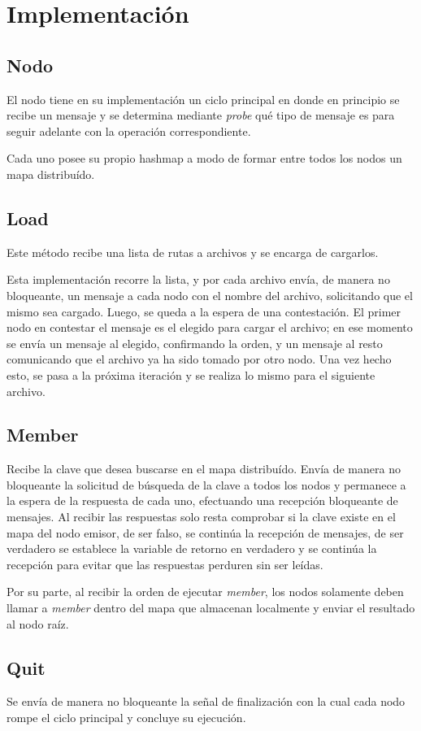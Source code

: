 \section{Implementación}

\subsection{Nodo}

El nodo tiene en su implementación un ciclo principal en donde en principio
se recibe un mensaje y se determina mediante \textit{probe} qué tipo de
mensaje es para seguir adelante con la operación correspondiente.

Cada uno posee su propio hashmap a modo de formar entre todos los nodos
un mapa distribuído.

\subsection{Load}

Este método recibe una lista de rutas a archivos y se encarga de cargarlos.

Esta implementación recorre la lista, y por cada archivo envía, de manera
no bloqueante, un mensaje a cada nodo con el nombre del archivo, solicitando
que el mismo sea cargado. Luego, se queda a la espera de una contestación. El
primer nodo en contestar el mensaje es el elegido para cargar el archivo; en
ese momento se envía un mensaje al elegido, confirmando la orden, y un mensaje
al resto comunicando que el archivo ya ha sido tomado por otro nodo. Una vez
hecho esto, se pasa a la próxima iteración y se realiza lo mismo para el
siguiente archivo.

\subsection{Member}

Recibe la clave que desea buscarse en el mapa distribuído. Envía de manera no
bloqueante la solicitud de búsqueda de la clave a todos los nodos y permanece
a la espera de la respuesta de cada uno, efectuando una recepción bloqueante
de mensajes. Al recibir las respuestas solo resta comprobar si la clave existe
en el mapa del nodo emisor, de ser falso, se continúa la recepción de
mensajes, de ser verdadero se establece la variable de retorno en verdadero y
se continúa la recepción para evitar que las respuestas perduren sin ser
leídas.

Por su parte, al recibir la orden de ejecutar \textit{member}, los nodos
solamente deben llamar a \textit{member} dentro del mapa que almacenan
localmente y enviar el resultado al nodo raíz.

\subsection{Quit}

Se envía de manera no bloqueante la señal de finalización con la cual cada
nodo rompe el ciclo principal y concluye su ejecución.
